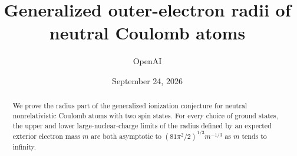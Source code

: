 \documentclass[11pt]{article}
\title{Generalized outer-electron radii of neutral Coulomb atoms}
\author{OpenAI}
\date{September 24, 2026}
\theoremstyle{definition}
\theoremstyle{remark}
\numberwithin{equation}{section}
\newcommand{\1}{\mathbf1}
\begin{document}
\maketitle
\begin{abstract}
We prove the radius part of the generalized ionization conjecture for
neutral nonrelativistic Coulomb atoms with two spin states. For every
choice of ground states, the upper and lower large-nuclear-charge limits
of the radius defined by an expected exterior electron mass $m$ are both
asymptotic to $(81\pi^2/2)^{1/3}m^{-1/3}$ as $m$ tends to infinity.
\end{abstract}
\setcounter{tocdepth}{1}
\tableofcontents





\appendix


\end{document}
